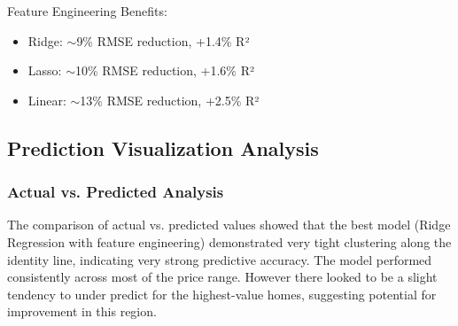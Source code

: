 \documentclass{article}
\begin{document}
Feature Engineering Benefits:
\begin{itemize}
    \item Ridge: $\sim$9\% RMSE reduction, +1.4\% R²
    \item Lasso: $\sim$10\% RMSE reduction, +1.6\% R²
    \item Linear: $\sim$13\% RMSE reduction, +2.5\% R²
\end{itemize}



\subsection{Prediction Visualization Analysis}

\subsubsection{Actual vs. Predicted Analysis}
The comparison of actual vs. predicted values showed that the best model (Ridge Regression with feature engineering) demonstrated very tight clustering along the identity line, indicating very strong predictive accuracy. The model performed consistently across most of the price range. However there looked to be a slight tendency to under predict for the highest-value homes, suggesting potential for improvement in this region.
\end{document}
